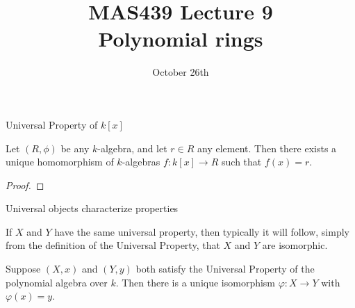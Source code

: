 \documentclass{beamer}
\title{MAS439 Lecture 9 \\ Polynomial rings}
\date{October 26th}
\begin{document}
\begin{frame}
\titlepage
\end{frame}

\begin{frame}{Universal Property of $k[x]$}

\begin{lemma} Let $(R,\phi)$ be any $k$-algebra, and let $r\in R$ any element.  Then there exists a unique homomorphism of $k$-algebras $f:k[x]\to R$ such that $f(x)=r$.
\end{lemma}


\begin{proof}
\end{proof}

\end{frame}








\begin{frame}{Universal objects characterize properties}

If $X$ and $Y$ have the same universal property, then typically it will follow, simply from the definition of the Universal Property, that $X$ and $Y$ are isomorphic.

\begin{lemma} Suppose $(X,x)$ and $(Y,y)$ both satisfy the Universal Property of the polynomial algebra over $k$.  Then there is a unique isomorphism $\varphi:X\to Y$ with $\varphi(x)=y$.
\end{lemma}

\end{frame}
\end{document}
